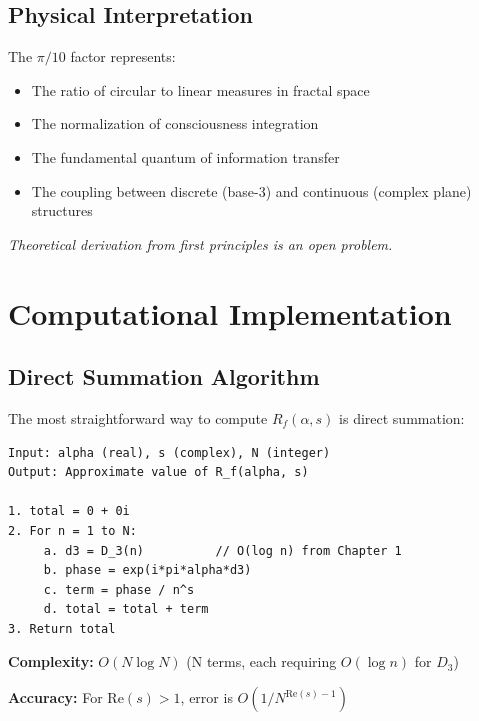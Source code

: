 \subsection{Physical Interpretation}

The $\pi/10$ factor represents:
\begin{itemize}
\item The ratio of circular to linear measures in fractal space
\item The normalization of consciousness integration
\item The fundamental quantum of information transfer
\item The coupling between discrete (base-3) and continuous (complex plane) structures
\end{itemize}

\textit{Theoretical derivation from first principles is an open problem.}

\section{Computational Implementation}
\label{sec:computation}


\subsection{Direct Summation Algorithm}

The most straightforward way to compute $R_f(\alpha, s)$ is direct summation:

\begin{algorithm}
\begin{verbatim}
Input: alpha (real), s (complex), N (integer)
Output: Approximate value of R_f(alpha, s)

1. total = 0 + 0i
2. For n = 1 to N:
     a. d3 = D_3(n)          // O(log n) from Chapter 1
     b. phase = exp(i*pi*alpha*d3)
     c. term = phase / n^s
     d. total = total + term
3. Return total
\end{verbatim}
\end{algorithm}

\textbf{Complexity:} $O(N \log N)$ (N terms, each requiring $O(\log n)$ for $D_3$)

\textbf{Accuracy:} For $\text{Re}(s) > 1$, error is $O(1/N^{\text{Re}(s)-1})$

